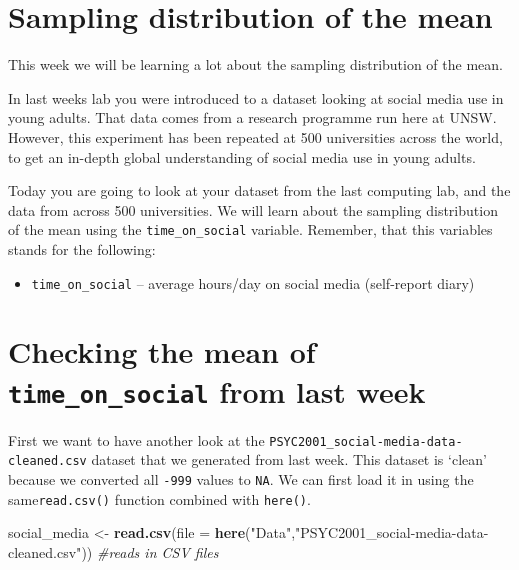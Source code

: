 \documentclass[
]{book}
\newenvironment{Shaded}{\begin{snugshade}}{\end{snugshade}}
\newcommand{\AttributeTok}[1]{\textcolor[rgb]{0.13,0.29,0.53}{#1}}
\newcommand{\CommentTok}[1]{\textcolor[rgb]{0.56,0.35,0.01}{\textit{#1}}}
\newcommand{\FunctionTok}[1]{\textcolor[rgb]{0.13,0.29,0.53}{\textbf{#1}}}
\newcommand{\NormalTok}[1]{#1}
\newcommand{\OtherTok}[1]{\textcolor[rgb]{0.56,0.35,0.01}{#1}}
\newcommand{\StringTok}[1]{\textcolor[rgb]{0.31,0.60,0.02}{#1}}
\providecommand{\tightlist}{%
  \setlength{\itemsep}{0pt}\setlength{\parskip}{0pt}}
\begin{document}
\section{Sampling distribution of the mean}\label{sampling-distribution-of-the-mean}

This week we will be learning a lot about the sampling distribution of the mean.

In last weeks lab you were introduced to a dataset looking at social media use in young adults. That data comes from a research programme run here at UNSW. However, this experiment has been repeated at 500 universities across the world, to get an in-depth global understanding of social media use in young adults.

Today you are going to look at your dataset from the last computing lab, and the data from across 500 universities. We will learn about the sampling distribution of the mean using the \texttt{time\_on\_social} variable. Remember, that this variables stands for the following:

\begin{itemize}
\tightlist
\item
  \texttt{time\_on\_social} -- average hours/day on social media (self-report diary)
\end{itemize}

\section{\texorpdfstring{Checking the mean of \texttt{time\_on\_social} from last week}{Checking the mean of time\_on\_social from last week}}\label{checking-the-mean-of-time_on_social-from-last-week}

First we want to have another look at the \texttt{PSYC2001\_social-media-data-cleaned.csv} dataset that we generated from last week. This dataset is `clean' because we converted all \texttt{-999} values to \texttt{NA}. We can first load it in using the same\texttt{read.csv()} function combined with \texttt{here()}.

\begin{Shaded}
\begin{Highlighting}[]
\NormalTok{social\_media }\OtherTok{\textless{}{-}} \FunctionTok{read.csv}\NormalTok{(}\AttributeTok{file =} \FunctionTok{here}\NormalTok{(}\StringTok{"Data"}\NormalTok{,}\StringTok{"PSYC2001\_social{-}media{-}data{-}cleaned.csv"}\NormalTok{)) }\CommentTok{\#reads in CSV files}
\end{Highlighting}
\end{Shaded}
\end{document}
